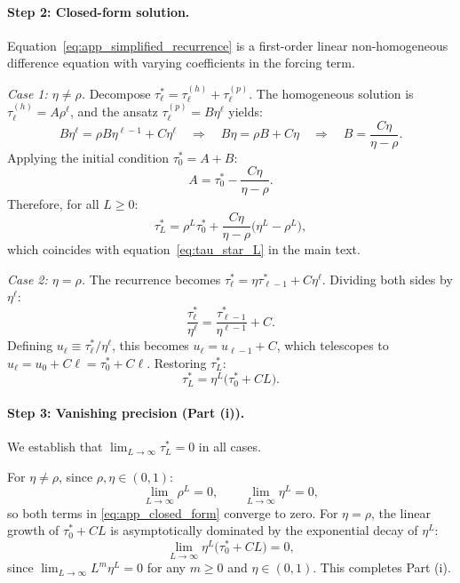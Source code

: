 \paragraph{Step 2: Closed-form solution.}
Equation~\eqref{eq:app_simplified_recurrence} is a first-order linear non-homogeneous difference equation with varying coefficients in the forcing term.

\textit{Case 1: $\eta \neq \rho$.} Decompose $\tau^{*}_{\ell} = \tau^{(h)}_{\ell} + \tau^{(p)}_{\ell}$. The homogeneous solution is $\tau^{(h)}_{\ell} = A \rho^{\ell}$, and the ansatz $\tau^{(p)}_{\ell} = B \eta^{\ell}$ yields:
\begin{equation*}
B\eta^{\ell} = \rho B \eta^{\ell-1} + C\eta^{\ell}
\quad\Longrightarrow\quad
B\eta = \rho B + C\eta
\quad\Longrightarrow\quad
B = \frac{C\eta}{\eta - \rho}.
\end{equation*}
Applying the initial condition $\tau^{*}_{0} = A + B$:
\begin{equation}
A = \tau^{*}_{0} - \frac{C\eta}{\eta - \rho}.
\end{equation}
Therefore, for all $L \geq 0$:
\begin{equation}\label{eq:app_closed_form}
\tau^{*}_{L} = \rho^{L}\tau^{*}_{0} + \frac{C\eta}{\eta - \rho}\bigl(\eta^{L} - \rho^{L}\bigr),
\end{equation}
which coincides with equation~\eqref{eq:tau_star_L} in the main text.

\textit{Case 2: $\eta = \rho$.} The recurrence becomes $\tau^{*}_{\ell} = \eta \tau^{*}_{\ell-1} + C\eta^{\ell}$. Dividing both sides by $\eta^{\ell}$:
\begin{equation}
\frac{\tau^{*}_{\ell}}{\eta^{\ell}} = \frac{\tau^{*}_{\ell-1}}{\eta^{\ell-1}} + C.
\end{equation}
Defining $u_{\ell} \equiv \tau^{*}_{\ell}/\eta^{\ell}$, this becomes $u_{\ell} = u_{\ell-1} + C$, which telescopes to $u_{\ell} = u_{0} + C\ell = \tau^{*}_{0} + C\ell$. Restoring $\tau^{*}_{L}$:
\begin{equation}\label{eq:app_equal_case}
\tau^{*}_{L} = \eta^{L}\bigl(\tau^{*}_{0} + CL\bigr).
\end{equation}

\paragraph{Step 3: Vanishing precision (Part (i)).}
We establish that $\lim_{L\to\infty} \tau^{*}_{L} = 0$ in all cases.

For $\eta \neq \rho$, since $\rho, \eta \in (0,1)$:
\begin{equation}
\lim_{L\to\infty} \rho^{L} = 0, \qquad \lim_{L\to\infty} \eta^{L} = 0,
\end{equation}
so both terms in \eqref{eq:app_closed_form} converge to zero. For $\eta = \rho$, the linear growth of $\tau^{*}_{0} + CL$ is asymptotically dominated by the exponential decay of $\eta^{L}$:
\begin{equation}
\lim_{L\to\infty} \eta^{L}\bigl(\tau^{*}_{0} + CL\bigr) = 0,
\end{equation}
since $\lim_{L\to\infty} L^{m} \eta^{L} = 0$ for any $m \geq 0$ and $\eta \in (0,1)$. This completes Part (i).

